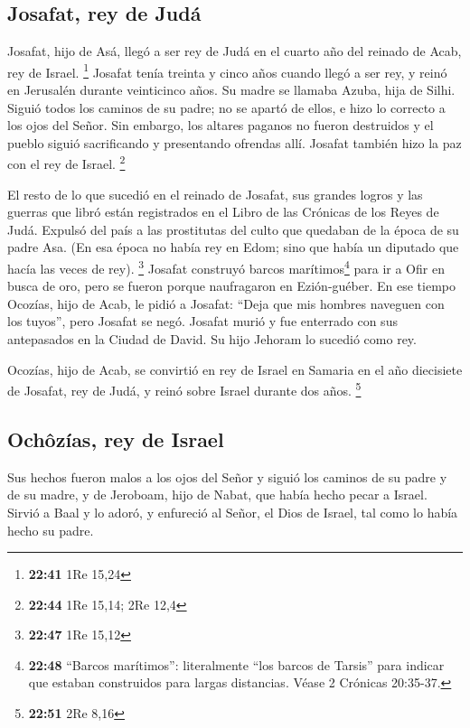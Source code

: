 \hypertarget{josafat-rey-de-juduxe1}{%
\subsection{Josafat, rey de Judá}\label{josafat-rey-de-juduxe1}}

 Josafat, hijo de Asá, llegó a ser rey de Judá en el
cuarto año del reinado de Acab, rey de Israel. \footnote{\textbf{22:41}
  1Re 15,24}  Josafat tenía treinta y cinco años cuando
llegó a ser rey, y reinó en Jerusalén durante veinticinco años. Su madre
se llamaba Azuba, hija de Silhi.  Siguió todos los
caminos de su padre; no se apartó de ellos, e hizo lo correcto a los
ojos del Señor. Sin embargo, los altares paganos no fueron destruidos y
el pueblo siguió sacrificando y presentando ofrendas allí.
 Josafat también hizo la paz con el rey de Israel.
\footnote{\textbf{22:44} 1Re 15,14; 2Re 12,4}

 El resto de lo que sucedió en el reinado de Josafat, sus
grandes logros y las guerras que libró están registrados en el Libro de
las Crónicas de los Reyes de Judá.  Expulsó del país a
las prostitutas del culto que quedaban de la época de su padre Asa.
 (En esa época no había rey en Edom; sino que había un
diputado que hacía las veces de rey). \footnote{\textbf{22:47} 1Re 15,12}
 Josafat construyó barcos marítimos\footnote{\textbf{22:48}
  ``Barcos marítimos'': literalmente ``los barcos de Tarsis'' para
  indicar que estaban construidos para largas distancias. Véase 2
  Crónicas 20:35-37.} para ir a Ofir en busca de oro, pero se fueron
porque naufragaron en Ezión-guéber.  En ese tiempo
Ocozías, hijo de Acab, le pidió a Josafat: ``Deja que mis hombres
naveguen con los tuyos'', pero Josafat se negó.  Josafat
murió y fue enterrado con sus antepasados en la Ciudad de David. Su hijo
Jehoram lo sucedió como rey.

 Ocozías, hijo de Acab, se convirtió en rey de Israel en
Samaria en el año diecisiete de Josafat, rey de Judá, y reinó sobre
Israel durante dos años. \footnote{\textbf{22:51} 2Re 8,16}

\hypertarget{ochuxf4zuxedas-rey-de-israel}{%
\subsection{Ochôzías, rey de
Israel}\label{ochuxf4zuxedas-rey-de-israel}}

 Sus hechos fueron malos a los ojos del Señor y siguió
los caminos de su padre y de su madre, y de Jeroboam, hijo de Nabat, que
había hecho pecar a Israel.  Sirvió a Baal y lo adoró, y
enfureció al Señor, el Dios de Israel, tal como lo había hecho su padre.
